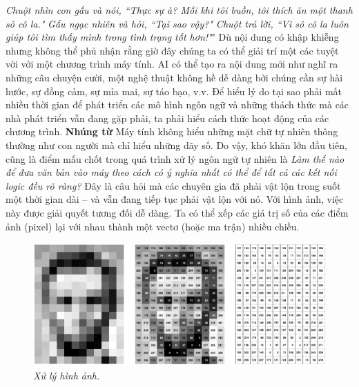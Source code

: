 \begin{multicols}{2}
	\vskip 0.1cm
	\textit{Chuột nhìn con gấu và nói, ``Thực sự à? Mỗi khi tôi buồn, tôi thích ăn một thanh sô cô la."}
	\vskip 0.1cm
	\textit{Gấu ngạc nhiên và hỏi, ``Tại sao vậy?"} 
	\vskip 0.1cm
	\textit{Chuột trả lời, ``Vì sô cô la luôn giúp tôi tìm thấy mình trong tình trạng tốt hơn!"}"
	\vskip 0.1cm
	Dù nội dung có khập khiễng nhưng không thể phủ nhận rằng giờ đây chúng ta có thể giải trí một các tuyệt vời với một chương trình máy tính. AI có thể tạo ra nội dung mới như nghĩ ra những câu chuyện cười, một nghệ thuật không hề dễ dàng bởi chúng cần sự hài hước, sự đồng cảm, sự mỉa mai, sự táo bạo, v.v. Để hiểu lý do tại sao phải mất nhiều thời gian để phát triển các mô hình ngôn ngữ và những thách thức mà các nhà phát triển vẫn đang gặp phải, ta phải hiểu cách thức hoạt động của các chương trình.
	\vskip 0.1cm
	\textbf{\color{timhieukhoahoc}Nhúng từ}
	\vskip 0.1cm
	Máy tính không hiểu những mặt chữ tự nhiên thông thường như con người mà chỉ hiểu những dãy số. Do vậy, khó khăn lớn đầu tiên, cũng là điểm mấu chốt trong quá trình xử lý ngôn ngữ tự nhiên là \textit{Làm thế nào để đưa văn bản vào máy theo cách có ý nghĩa nhất có thể để tất cả các kết nối logic đều rõ ràng?} Đây là câu hỏi mà các chuyên gia đã phải vật lộn trong suốt một thời gian dài -- và vẫn đang tiếp tục phải vật lộn với nó. 
	\vskip 0.1cm
	Với hình ảnh, việc này được giải quyết tương đối dễ dàng. Ta có thể xếp các giá trị số của các điểm ảnh (pixel) lại với nhau thành một vectơ (hoặc ma trận) nhiều chiều. 
	\begin{figure}[H]
		\vspace*{-5pt}
		\centering
		\captionsetup{labelformat= empty, justification=centering}
		\includegraphics[width= 1\linewidth]{Computer_Vison.png}
		\caption{\small\textit{\color{timhieukhoahoc}Xử lý hình ảnh.}}
		\vspace*{-10pt}
	\end{figure}

\end{multicols}
